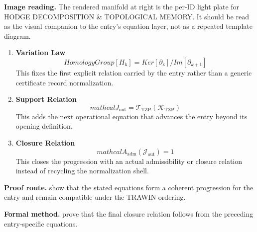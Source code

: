 \begin{samepage}
\noindent\begin{minipage}[t]{0.45\linewidth}
\vspace{0pt}
\raggedright
\scriptsize\textbf{Image reading.} The rendered manifold at right is the per-ID light plate for HODGE DECOMPOSITION \& TOPOLOGICAL MEMORY. It should be read as the visual companion to the entry's equation layer, not as a repeated template diagram.\par
\end{minipage}\hfill
\begin{minipage}[t]{0.53\linewidth}
\vspace*{-0.10in}
\raggedright
{}
\end{minipage}
\end{samepage}

\clearpage


\begin{enumerate}[leftmargin=1.6em,itemsep=9pt,topsep=6pt]
\item \textbf{Variation Law}
\[
HomologyGroup[H_{\mathrm{k}}] = Ker[\partial_{\mathrm{k}}]/Im[\partial_{k+1}]
\]
This fixes the first explicit relation carried by the entry rather than a generic certificate record normalization.

\item \textbf{Support Relation}
\[
mathcal{J}_{\mathrm{out}} = \mathcal{T}_{\mathrm{TZP}}\!\left(\mathcal{K}_{\mathrm{TZP}}\right)
\]
This adds the next operational equation that advances the entry beyond its opening definition.

\item \textbf{Closure Relation}
\[
mathcal{A}_{\mathrm{adm}}\!\left(\mathcal{J}_{\mathrm{out}}\right)=1
\]
This closes the progression with an actual admissibility or closure relation instead of recycling the normalization shell.
\end{enumerate}

\textbf{Proof route.} show that the stated equations form a coherent progression for the entry and remain compatible under the TRAWIN ordering.

\textbf{Formal method.} prove that the final closure relation follows from the preceding entry-specific equations.

\medskip
{}

